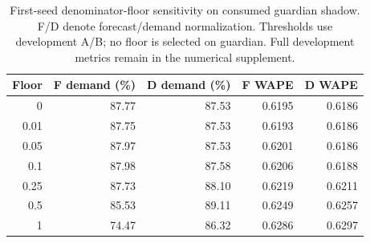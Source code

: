 \begin{table}[htbp]
\centering\small
\caption{First-seed denominator-floor sensitivity on consumed guardian shadow. F/D denote forecast/demand normalization. Thresholds use development A/B; no floor is selected on guardian. Full development metrics remain in the numerical supplement.}
\label{tab:floors}
\begin{tabular}{rrrrr}\toprule
Floor & F demand (\%) & D demand (\%) & F WAPE & D WAPE\\\midrule
0 & 87.77 & 87.53 & 0.6195 & 0.6186\\
0.01 & 87.75 & 87.53 & 0.6193 & 0.6186\\
0.05 & 87.97 & 87.53 & 0.6201 & 0.6186\\
0.1 & 87.98 & 87.58 & 0.6206 & 0.6188\\
0.25 & 87.73 & 88.10 & 0.6219 & 0.6211\\
0.5 & 85.53 & 89.11 & 0.6249 & 0.6257\\
1 & 74.47 & 86.32 & 0.6286 & 0.6297\\
\bottomrule\end{tabular}
\end{table}
